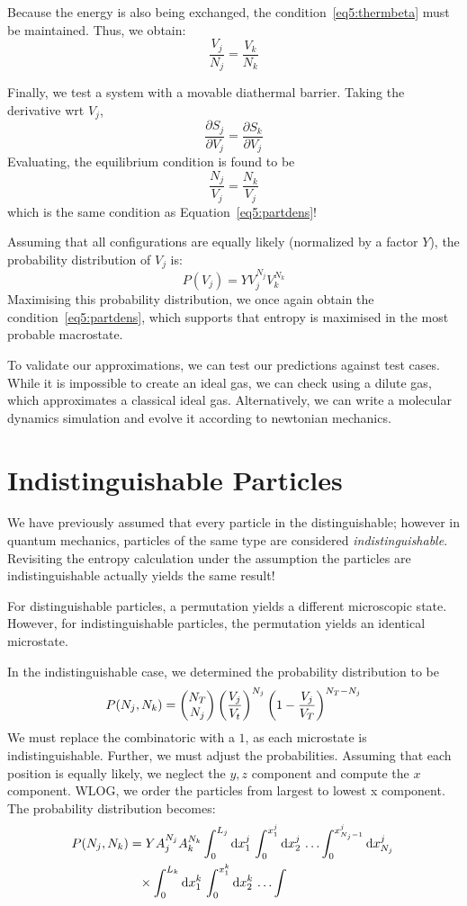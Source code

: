 Because the energy is also being exchanged, the condition~\ref{eq5:thermbeta} must be maintained. Thus, we obtain:
\begin{equation}
	\frac{V_j}{N_j}=\frac{V_k}{N_k}\label{eq5:partdens}
\end{equation}

Finally, we test a system with a movable diathermal barrier.  Taking the derivative wrt \(V_j\),
\begin{equation}
	\frac{\partial S_j}{\partial V_j}=\frac{\partial S_k}{\partial V_j}
\end{equation}
Evaluating, the equilibrium condition is found to be 
\[\frac{N_j}{V_j}=\frac{N_k}{V_j}\]
which is the same condition as Equation~\ref{eq5:partdens}!

Assuming that all configurations are equally likely (normalized by a factor \(Y\)), the probability distribution of \(V_j\) is:
\begin{equation}
	P(V_j)=YV_j^{N_j}V_k^{N_k}
\end{equation}
Maximising this probability distribution, we once again obtain the condition~\ref{eq5:partdens}, which supports that entropy is maximised in the most probable macrostate.

To validate our approximations, we can test our predictions against test cases.
While it is impossible to create an ideal gas, we can check using a dilute gas, which approximates a classical ideal gas. Alternatively, we can write a molecular dynamics simulation and evolve it according to newtonian mechanics. 

\section{Indistinguishable Particles}
We have previously assumed that every particle in the distinguishable; however in quantum mechanics, particles of the same type are considered \emph{indistinguishable}. Revisiting the entropy calculation under the assumption the particles are indistinguishable actually yields the same result!

For distinguishable particles, a permutation yields a different microscopic state. However, for indistinguishable particles, the permutation yields an identical microstate.

In the indistinguishable case, we determined the probability distribution to be
\[P(N_j, N_k) = \begin{pmatrix}N_T\\N_j\end{pmatrix} \left(\frac{V_j}{V_t}\right)^{N_j}\left(1-\frac{V_j}{V_T}\right)^{N_T-N_j}\]
We must replace the combinatoric with a \(1\), as each microstate is indistinguishable. Further, we must adjust the probabilities. Assuming that each position is equally likely, we neglect the \(y,z\) component and compute the \(x\) component. WLOG, we order the particles from largest to lowest x component. The probability distribution becomes:
\begin{align*}
	P(N_j, N_k) &= YA_j^{N_j}A_k^{N_k}\int_0^{L_j}\d{x^j_1}\int_0^{x^j_1}\d{x^j_2}\dots \int_0^{x^j_{N_j-1}}\d{x^j_{N_j}}\\
		    &\hphantom{=}\times\int_0^{L_k}\d{x_1^k}\int_0^{x_1^k}\d{x_2^k}\dots\int
\end{align*}

